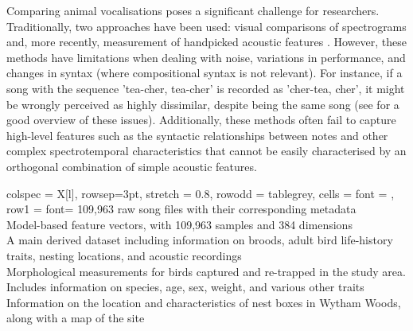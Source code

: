 Comparing animal vocalisations poses a significant challenge for researchers. Traditionally, two approaches have been used: visual comparisons of spectrograms and, more recently, measurement of handpicked acoustic features \parencite{goffinet2021}. However, these methods have limitations when dealing with noise, variations in performance, and changes in syntax (where compositional syntax is not relevant). For instance, if a song with the sequence 'tea-cher, tea-cher' is recorded as 'cher-tea, cher', it might be wrongly perceived as highly dissimilar, despite being the same song (see \cite{stowell2021, zandberg2022} for a good overview of these issues). Additionally, these methods often fail to capture high-level features such as the syntactic relationships between notes and other complex spectrotemporal characteristics that cannot be easily characterised by an orthogonal combination of simple acoustic features.

\begin{table}[ht!]
    \centering
    \label{table:summary}
    \begin{tblr}[
        theme=ntabs
        ]{
        colspec = {X[l]},
        rowsep=3pt,
        stretch = 0.8,
        row{odd} = {tablegrey}, %
        cells = {font = \fontsize{8pt}{8pt}\selectfont},
        row{1} = {font=\fontsize{8pt}{8pt}\selectfont} %
    }
        109,963 raw song files with their corresponding metadata\\
        Model-based feature vectors, with 109,963 samples and 384 dimensions\\
        A main derived dataset including information on broods, adult bird life-history traits, nesting locations, and acoustic recordings\\
        Morphological measurements for birds captured and re-trapped in the study area. Includes information on species, age, sex, weight, and various other traits\\
        Information on the location and characteristics of nest boxes in Wytham Woods, along with a map of the site\\
    \end{tblr}
\end{table}

